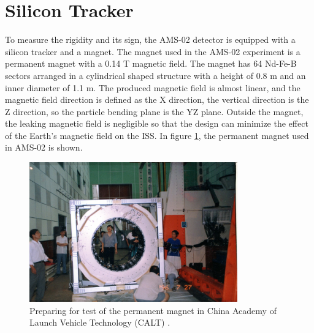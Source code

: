 
\section{Silicon Tracker}

To measure the rigidity and its sign, the AMS-02 detector is equipped with a silicon tracker and a magnet.
The magnet used in the AMS-02 experiment is a permanent magnet with a 0.14 T magnetic field. The magnet has 64 Nd-Fe-B sectors arranged in a cylindrical shaped structure with a height of 0.8 m and an inner diameter of 1.1 m. The produced magnetic field is almost linear, and the magnetic field direction is defined as the X direction, the vertical direction is the Z direction, so the particle bending plane is the YZ plane. Outside the magnet, the leaking magnetic field is negligible so that the design can minimize the effect of the Earth’s magnetic field on the ISS. In figure \ref{MagnetTest}, the permanent magnet used in AMS-02 is shown. 

\begin{figure}[htpb]
\centering
\includegraphics[width=0.8\textwidth, height=0.42\textheight ]{Figures/chapter3/Magnet/MagnetTest.jpg}
\caption[Preparing for test of the permanent magnet.]{Preparing for test of the permanent magnet in China Academy of Launch Vehicle Technology (CALT) \cite{AMSWebside}.}
\label{MagnetTest}
\end{figure}

